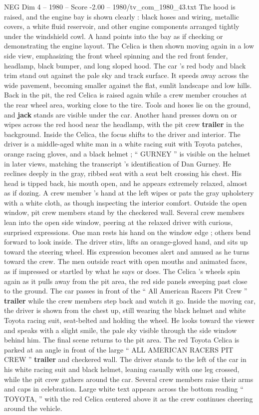 \begin{textsample}{NEG Dim 4 – 1980 – Score -2.00 – 1980/tv\_com\_1980\_43.txt}
The hood is raised, and the engine bay is shown clearly : black hoses and wiring, metallic covers, a white fluid reservoir, and other engine components arranged tightly under the windshield cowl.
A hand points into the bay as if checking or demonstrating the engine layout.
The Celica is then shown moving again in a low side view, emphasizing the front wheel spinning and the red front fender, headlamp, black bumper, and long sloped hood.
The car ’s red body and black trim stand out against the pale sky and track surface.
It speeds away across the wide pavement, becoming smaller against the flat, sunlit landscape and low hills.
Back in the pit, the red Celica is raised again while a crew member crouches at the rear wheel area, working close to the tire.
Tools and hoses lie on the ground, and \textbf{jack} stands are visible under the car.
Another hand presses down on or wipes across the red hood near the headlamp, with the pit crew \textbf{trailer} in the background.
Inside the Celica, the focus shifts to the driver and interior.
The driver is a middle-aged white man in a white racing suit with Toyota patches, orange racing gloves, and a black helmet ; “ GURNEY ” is visible on the helmet in later views, matching the transcript ’s identification of Dan Gurney.
He reclines deeply in the gray, ribbed seat with a seat belt crossing his chest.
His head is tipped back, his mouth open, and he appears extremely relaxed, almost as if dozing.
A crew member ’s hand at the left wipes or pats the gray upholstery with a white cloth, as though inspecting the interior comfort.
Outside the open window, pit crew members stand by the checkered wall.
Several crew members lean into the open side window, peering at the relaxed driver with curious, surprised expressions.
One man rests his hand on the window edge ; others bend forward to look inside.
The driver stirs, lifts an orange-gloved hand, and sits up toward the steering wheel.
His expression becomes alert and amused as he turns toward the crew.
The men outside react with open mouths and animated faces, as if impressed or startled by what he says or does.
The Celica ’s wheels spin again as it pulls away from the pit area, the red side panels sweeping past close to the ground.
The car passes in front of the “ All American Racers Pit Crew ” \textbf{trailer} while the crew members step back and watch it go.
Inside the moving car, the driver is shown from the chest up, still wearing the black helmet and white Toyota racing suit, seat-belted and holding the wheel.
He looks toward the viewer and speaks with a slight smile, the pale sky visible through the side window behind him.
The final scene returns to the pit area.
The red Toyota Celica is parked at an angle in front of the large “ ALL AMERICAN RACERS PIT CREW ” \textbf{trailer} and checkered wall.
The driver stands to the left of the car in his white racing suit and black helmet, leaning casually with one leg crossed, while the pit crew gathers around the car.
Several crew members raise their arms and caps in celebration.
Large white text appears across the bottom reading “ TOYOTA, ” with the red Celica centered above it as the crew continues cheering around the vehicle.

\end{textsample}
